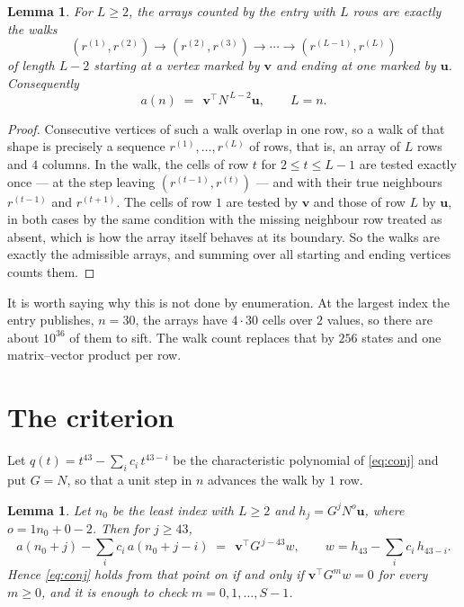 \documentclass[11pt,a4paper]{article}
\theoremstyle{plain}
\newtheorem{lemma}[theorem]{Lemma}
\theoremstyle{definition}
\begin{document}
\begin{lemma}\label{lem:walk}
For $L\ge2$, the arrays counted by the entry with $L$ rows are exactly the walks
\[
(r^{(1)},r^{(2)})\to(r^{(2)},r^{(3)})\to\cdots\to(r^{(L-1)},r^{(L)})
\]
of length $L-2$ starting at a vertex marked by $\mathbf{v}$ and ending at one marked by
$\mathbf{u}$. Consequently
\[
a(n)\;=\;\,\mathbf{v}^{\!\top}N^{\,L-2}\mathbf{u},\qquad L=n .
\]
\end{lemma}

\begin{proof}
Consecutive vertices of such a walk overlap in one row, so a walk of that shape is
precisely a sequence $r^{(1)},\dots,r^{(L)}$ of rows, that is, an array of $L$ rows
and $4$ columns. In the walk, the cells of row $t$ for $2\le t\le L-1$ are tested
exactly once --- at the step leaving $(r^{(t-1)},r^{(t)})$ --- and with their true
neighbours $r^{(t-1)}$ and $r^{(t+1)}$. The cells of row $1$ are tested by
$\mathbf{v}$ and those of row $L$ by $\mathbf{u}$, in both cases by the same condition
with the missing neighbour row treated as absent, which is how the array itself behaves at
its boundary. So the walks are exactly the admissible arrays, and summing over all starting
and ending vertices counts them.
\end{proof}


It is worth saying why this is not done by enumeration. At the largest index the entry
publishes, $n=30$, the arrays have $4\cdot30$ cells over
$2$ values, so there are about $10^{36}$ of them to sift. The
walk count replaces that by $256$ states and one matrix--vector product per row.
\section{The criterion}

Let $q(t)=t^{43}-\sum_i c_i\,t^{43-i}$ be the characteristic polynomial of
\eqref{eq:conj} and put $G=N$, so that a unit step in $n$ advances the walk by
$1$ row.

\begin{lemma}\label{lem:crit}
Let $n_0$ be the least index with $L\ge2$ and $h_j=G^{j}N^{o}\mathbf{u}$, where
$o=1n_0+0-2$. Then for $j\ge43$,
\[
a(n_0+j)-\sum_i c_i\,a(n_0+j-i)\;=\;\,\mathbf{v}^{\!\top}G^{\,j-43}w,
\qquad w=h_{43}-\sum_i c_i\,h_{43-i} .
\]
Hence \eqref{eq:conj} holds from that point on if and only if
$\mathbf{v}^{\!\top}G^{m}w=0$ for every $m\ge0$, and it is enough to check
$m=0,1,\dots,S-1$.
\end{lemma}
\end{document}
